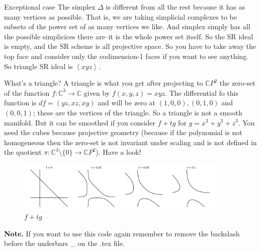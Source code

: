 \begin{thing6}{Exceptional case}\leavevmode
The simplex \(\Delta\) is different from all the rest because it has as many vertices as possible. That is, we are taking simplicial complexes to be subsets of the power set of as many vertices we like. And simplex simply has all the possible simplicices there are--it is the whole power set itself. So the SR ideal is empty, and the SR scheme is all projective space. So you have to take away the top face and consider only the codimension-1 faces if you want to see anything. So triangle SR ideal is \(\left<x yz\right>\).
\end{thing6}

\begin{exercise}\leavevmode
What's a triangle? A triangle is what you get after projecting to \(\mathbb{C}P^{2}\) the zero-set of the function \(f:\mathbb{C}^3 \to \mathbb{C}\) given by \(f(x,y,z)=xyz\). The differential fo this function is \(df=(yz,xz,xy)\) and will be zero at \((1,0,0),(0,1,0)\) and \((0,0,1)\); these are the vertices of the triangle. So a triangle is not a smooth manifold. But it can be smoothed if you consider \(f+tg\) for \(g=x^3+y^3+z^3\). You need the cubes because projective geometry (because if the polynomial is not homogeneous then the zero-set is not invariant under scaling and is not defined in the quotient \(\pi:\mathbb{C}^{3}\setminus\{0\}\to \mathbb{C}P^{2}\)). Have a look!

\begin{figure}[H]
	\centering
	\includegraphics[width=0.9\textwidth]{fig8.png}
	\caption*{\(f+tg\)}
\end{figure}
\textbf{Note.} If you want to use this code again remember to remove the backslash before the underbars \_ on the .tex file.


\end{exercise}
